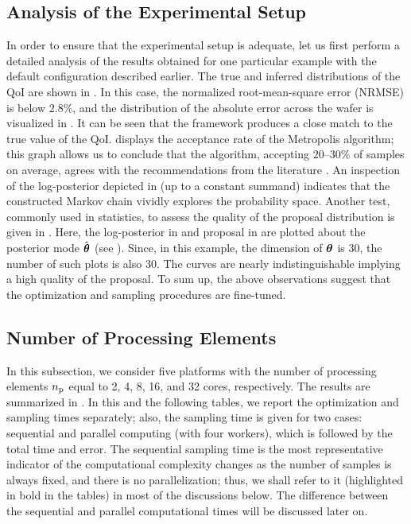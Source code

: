 \subsection{Analysis of the Experimental Setup}



In order to ensure that the experimental setup is adequate, let us first perform a detailed analysis of the results obtained for one particular example with the default configuration described earlier. The true and inferred distributions of the QoI are shown in . In this case, the normalized root-mean-square error (NRMSE) is below $2.8\%$, and the distribution of the absolute error across the wafer is visualized in . It can be seen that the framework produces a close match to the true value of the QoI.
 displays the acceptance rate of the Metropolis algorithm; this graph allows us to conclude that the algorithm, accepting $20$--$30\%$ of samples on average, agrees with the recommendations from the literature \cite{gelman2004}.
An inspection of the log-posterior depicted in  (up to a constant summand) indicates that the constructed Markov chain vividly explores the probability space.
Another test, commonly used in statistics, to assess the quality of the proposal distribution is given in . Here, the log-posterior in  and proposal in  are plotted about the posterior mode $\hat{{\boldsymbol\theta}}$ (see ). Since, in this example, the dimension of ${\boldsymbol\theta}$ is 30, the number of such plots is also 30. The curves are nearly indistinguishable implying a high quality of the proposal. To sum up, the above observations suggest that the optimization and sampling procedures are fine-tuned.

\subsection{Number of Processing Elements}
In this subsection, we consider five platforms with the number of processing elements ${n_\text{p}}$ equal to 2, 4, 8, 16, and 32 cores, respectively. The results are summarized in . In this and the following tables, we report the optimization and sampling times separately; also, the sampling time is given for two cases: sequential and parallel computing (with four workers), which is followed by the total time and error. The sequential sampling time is the most representative indicator of the computational complexity changes as the number of samples is always fixed, and there is no parallelization; thus, we shall refer to it (highlighted in bold in the tables) in most of the discussions below. The difference between the sequential and parallel computational times will be discussed later on.


